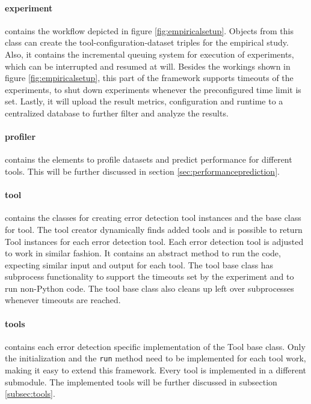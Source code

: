 \paragraph{experiment} contains the workflow depicted in figure \ref{fig:empiricalsetup}. Objects from this class can create the tool-configuration-dataset triples for the empirical study. Also, it contains the incremental queuing system for execution of experiments, which can be interrupted and resumed at will. Besides the workings shown in figure \ref{fig:empiricalsetup}, this part of the framework supports timeouts of the experiments, to shut down experiments whenever the preconfigured time limit is set. Lastly, it will upload the result metrics, configuration and runtime to a centralized database to further filter and analyze the results.

\paragraph{profiler} contains the elements to profile datasets and predict performance for different tools. This will be further discussed in section \ref{sec:performanceprediction}.

\paragraph{tool} contains the classes for creating error detection tool instances and the base class for tool. The tool creator dynamically finds added tools and is possible to return Tool instances for each error detection tool. Each error detection tool is adjusted to work in similar fashion. It contains an abstract method to run the code, expecting similar input and output for each tool. The tool base class has subprocess functionality to support the timeouts set by the experiment and to run non-Python code. The tool base class also cleans up left over subprocesses whenever timeouts are reached. 

\paragraph{tools} contains each error detection specific implementation of the Tool base class. Only the initialization and the \verb|run| method need to be implemented for each tool work, making it easy to extend this framework. Every tool is implemented in a different submodule. The implemented tools will be further discussed in subsection \ref{subsec:tools}. 



